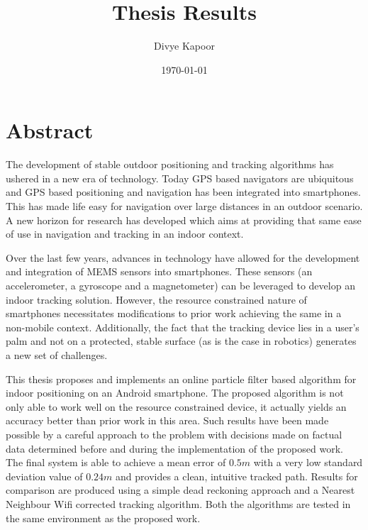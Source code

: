 \documentclass[11pt,a4paper,twoside]{book}
\begin{document}
\frontmatter

\title{Thesis Results}
\author{Divye Kapoor}
\date{\today}
\maketitle

\cleardoublepage
{}




\chapter{Abstract}

The development of stable outdoor positioning and tracking algorithms has 
ushered in a new era of technology. Today GPS based navigators are 
ubiquitous and GPS based positioning and navigation has been integrated 
into smartphones. This has made life easy for navigation over large 
distances in an outdoor scenario. A new horizon for research has developed which
aims at providing that same ease of use in navigation 
and tracking in an indoor context.

Over the last few years, advances in technology have allowed for the 
development and integration of MEMS sensors into smartphones. These sensors 
(an accelerometer, a gyroscope and a magnetometer) can be leveraged to 
develop an indoor tracking solution. However, the resource constrained nature 
of smartphones necessitates modifications to prior work achieving the same 
in a non-mobile context. Additionally, the fact that 
the tracking device lies in a user's palm and not on a protected, stable 
surface (as is the case in robotics) generates a new set of challenges.

This thesis proposes and implements an online particle filter based algorithm for 
indoor positioning on an Android smartphone. The proposed algorithm 
is not only able to work well on the resource constrained device, it actually
yields an accuracy better than prior work in this area. Such results have 
been made possible by a careful approach to the problem with decisions made 
on factual data determined before and during the implementation of the 
proposed work. The final system is able to achieve a mean error of $0.5 m$
with a very low standard deviation value of $0.24 m$ and provides a clean,
intuitive tracked path. Results for comparison are produced using
a simple dead reckoning approach and a Nearest Neighbour 
Wifi corrected tracking algorithm. Both the algorithms are tested in the same
environment as the proposed work.
\end{document}
